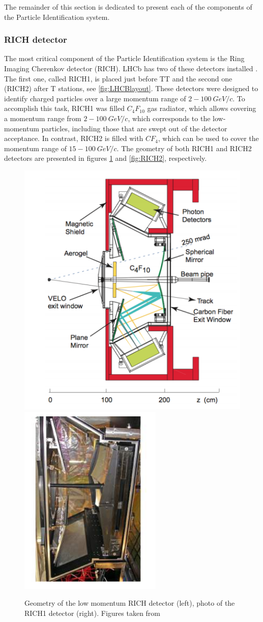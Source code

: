 The remainder of this section is dedicated to present each of the components of the Particle Identification system.


\subsubsection{RICH detector}

The most critical component of the Particle Identification system is the Ring Imaging Cherenkov detector (RICH). LHCb has two of these detectors installed \cite{RICH_performance}. The first one, called RICH1, is placed just before TT and the second one (RICH2) after T stations, see \ref{fig:LHCBlayout}. These detectors were designed to identify charged particles over a large momentum range of $2-100~ GeV/c$. To accomplish this task, RICH1 was filled $C_4F_{10}$ gas radiator, which allows covering a momentum range from $2-100~ GeV/c$, which corresponds to the low-momentum particles, including those that are swept out of the detector acceptance. In contrast, RICH2 is filled with $CF_4$, which can be used to cover the momentum range of  $15-100~ GeV/c$. The geometry of both RICH1 and RICH2 detectors are presented in figures \ref{fig:RICH1} and \ref{fig:RICH2}, respectively. 


\begin{figure}[h]
 \begin{center}
  \includegraphics[width=0.49\linewidth]{figures/RICH1.PNG}
   \includegraphics[width=0.49\linewidth]{figures/RICH1_photo.PNG}
    \caption{Geometry of the low momentum RICH detector (left), photo of the RICH1 detector (right). Figures taken from \cite{lhcb}}%
\label{fig:RICH1}%
 \end{center}
\end{figure}


